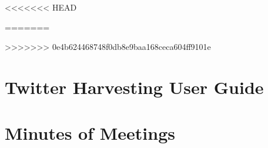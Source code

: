 \documentclass[12pt,a4paper,draft]{report}
\begin{document}

\maketitle



\clearpage{}
\tableofcontents

\clearpage{}

% 










\nocite{*} %


<<<<<<< HEAD

=======

>>>>>>> 0e4b624468748f0db8e9baa168ceca604ff9101e

\appendix
\chapter{Twitter Harvesting User Guide}


\chapter{Minutes of Meetings}
\label{sec:minutes}


\end{document}
